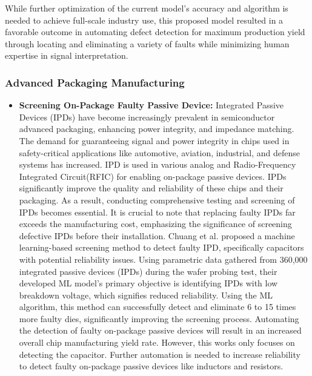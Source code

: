 \begin{itemize}
    While further optimization of the current model’s accuracy and algorithm is needed to achieve full-scale industry use, this proposed model resulted in a favorable outcome in automating defect detection for maximum production yield through locating and eliminating a variety of faults while minimizing human expertise in signal interpretation.  
\end{itemize}

\subsubsection{Advanced Packaging Manufacturing}
    \begin{itemize}
    \item \textbf{Screening On-Package Faulty Passive Device:}
    Integrated Passive Devices (IPDs) have become increasingly prevalent in semiconductor advanced packaging, enhancing power integrity, and impedance matching. The demand for guaranteeing signal and power integrity in chips used in safety-critical applications like automotive, aviation, industrial, and defense systems has increased. IPD is used in various analog and Radio-Frequency Integrated Circuit(RFIC) for enabling on-package passive devices. IPDs significantly improve the quality and reliability of these chips and their packaging. As a result, conducting comprehensive testing and screening of IPDs becomes essential. It is crucial to note that replacing faulty IPDs far exceeds the manufacturing cost, emphasizing the significance of screening defective IPDs before their installation. Chuang et al. \cite{IPD_detection} proposed a machine learning-based screening method to detect faulty IPD, specifically capacitors with potential reliability issues. Using parametric data gathered from 360,000 integrated passive devices (IPDs) during the wafer probing test, their developed ML model’s primary objective is identifying IPDs with low breakdown voltage, which signifies reduced reliability. Using the ML algorithm, this method can successfully detect and eliminate 6 to 15 times more faulty dies, significantly improving the screening process. 
    Automating the detection of faulty on-package passive devices will result in an increased overall chip manufacturing yield rate. However, this works only focuses on detecting the capacitor. Further automation is needed to increase reliability to detect faulty on-package passive devices like inductors and resistors.


\end{itemize}
